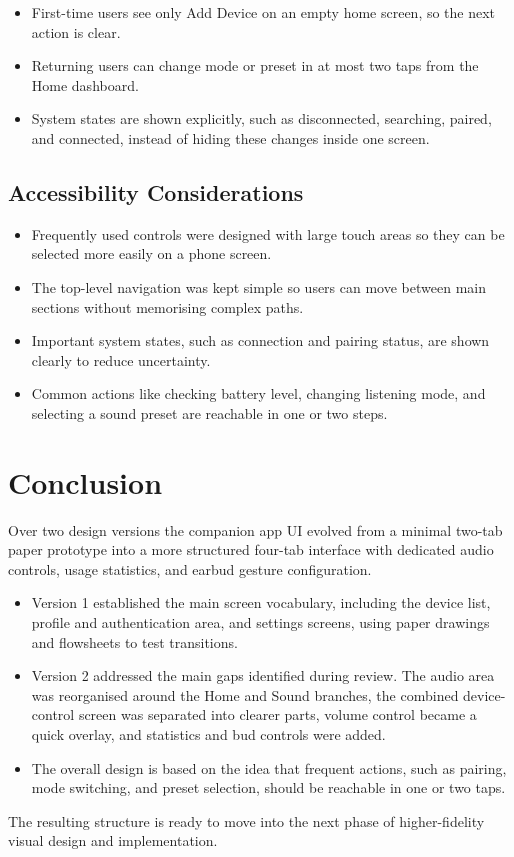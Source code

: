 \documentclass[12pt, a4paper]{report}
\begin{document}
\begin{itemize}
  \item First-time users see only Add Device on an empty home screen, so the next
    action is clear.
  \item Returning users can change mode or preset in at most two taps from the
    Home dashboard.
  \item System states are shown explicitly, such as disconnected, searching,
    paired, and connected, instead of hiding these changes inside one screen.
\end{itemize}

\section{Accessibility Considerations}

\begin{itemize}
  \item Frequently used controls were designed with large touch areas so they can
    be selected more easily on a phone screen.
  \item The top-level navigation was kept simple so users can move between main
    sections without memorising complex paths.
  \item Important system states, such as connection and pairing status, are shown
    clearly to reduce uncertainty.
  \item Common actions like checking battery level, changing listening mode, and
    selecting a sound preset are reachable in one or two steps.
\end{itemize}

\chapter{Conclusion}

Over two design versions the companion app UI evolved from a minimal two-tab paper
prototype into a more structured four-tab interface with dedicated audio controls,
usage statistics, and earbud gesture configuration.

\begin{itemize}
  \item Version 1 established the main screen vocabulary, including the device list,
    profile and authentication area, and settings screens, using paper drawings and
    flowsheets to test transitions.
  \item Version 2 addressed the main gaps identified during review. The audio area
    was reorganised around the Home and Sound branches, the combined device-control
    screen was separated into clearer parts, volume control became a quick overlay, and
    statistics and bud controls were added.
  \item The overall design is based on the idea that frequent actions, such as
    pairing, mode switching, and preset selection, should be reachable in one or
    two taps.
\end{itemize}

The resulting structure is ready to move into the next phase of higher-fidelity
visual design and implementation.

\end{document}
